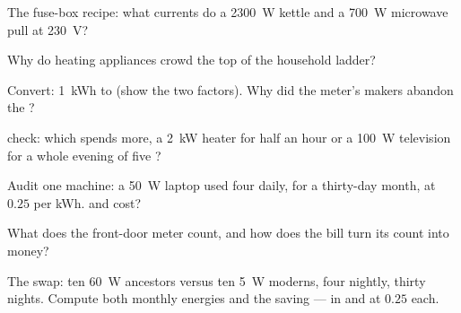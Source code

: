 \begin{exercise}[$\star$]\label{exo:g9:electric-power-energy:3}
The fuse-box recipe: what currents do a \qty{2300}{W}
kettle and a \qty{700}{W} microwave pull at \qty{230}{V}?
\end{exercise}

\begin{exercise}[$\star$]\label{exo:g9:electric-power-energy:4}
Why do heating appliances crowd the top of the household
 ladder?
\end{exercise}

\begin{exercise}[$\star$]\label{exo:g9:electric-power-energy:5}
Convert: \qty{1}{kWh} to  (show the two factors).
Why did the meter's makers abandon the ?
\end{exercise}

\begin{exercise}[$\star$]\label{exo:g9:electric-power-energy:6}
 check: which spends more, a \qty{2}{kW} heater for
half an hour or a \qty{100}{W} television for a whole
evening of five ?
\end{exercise}

\begin{exercise}[$\star$]\label{exo:g9:electric-power-energy:7}
Audit one machine: a \qty{50}{W} laptop used four 
daily, for a thirty-day month, at $0.25$ per \unit{kWh}.
 and cost?
\end{exercise}

\begin{exercise}[$\star$]\label{exo:g9:electric-power-energy:8}
What does the front-door meter count, and how does the
bill turn its count into money?
\end{exercise}

\begin{exercise}[$\star\star$]\label{exo:g9:electric-power-energy:9}
The  swap: ten \qty{60}{W} ancestors versus ten
\qty{5}{W} moderns, four  nightly, thirty nights.
Compute both monthly energies and the saving --- in
 and at $0.25$ each.
\end{exercise}

